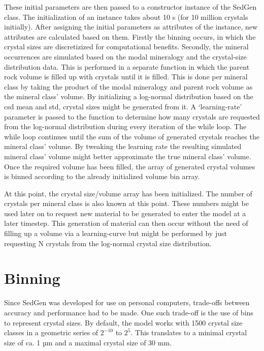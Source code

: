 These initial parameters are then passed to a constructor instance of the SedGen class. %
The initialization of an instance takes about 10 s (for 10 million crystals initially). %
After assigning the initial parameters as attributes of the instance, new attributes are calculated based on them. %
Firstly the binning occurs, in which the crystal sizes are discretizized for computational benefits. %
Secondly, the mineral occurrences are simulated based on the modal mineralogy and the crystal-size distribution data. %
    This is performed in a separate function in which the parent rock volume is filled up with crystals until it is filled. %
    This is done per mineral class by taking the product of the modal mineralogy and parent rock volume as the mineral class' volume. %
    By initializing a log-normal distribution based on the csd mean and std, crystal sizes might be generated from it.
    A `learning-rate' parameter is passed to the function to determine how many crystals are requested from the log-normal distribution during every iteration of the while loop. %
    The while loop continues until the sum of the volume of generated crystals reaches the mineral class' volume. %
    By tweaking the learning rate the resulting simulated mineral class' volume might better approximate the true mineral class' volume. %
    Once the required volume has been filled, the array of generated crystal volumes is binned according to the already initialized volume bin array. %

At this point, the crystal size/volume array has been initialized. %
The number of crystals per mineral class is also known at this point. %
These numbers might be used later on to request new material to be generated to enter the model at a later timestep. %
This generation of material can then occur without the need of filling up a volume via a learning-curve but might be performed by just requesting N crystals from the log-normal crystal size distribution. %



\section{Binning}
Since SedGen was developed for use on personal computers, trade-offs between accuracy and performance had to be made. %
One such trade-off is the use of bins to represent crystal sizes. %
By default, the model works with 1500 crystal size classes in a geometric series of \(2^{-10}\) to \(2^{5}\). %
This translates to a minimal crystal size of ca. 1 µm and a maximal crystal size of 30 mm. %

